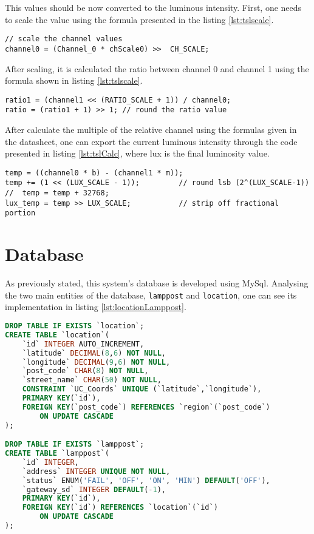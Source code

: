 This values should be now converted to the luminous intensity. First, one needs to scale the value using the formula presented in the listing \ref{lst:tslscale}.

\begin{lstlisting}[caption={TSL2581 Channel 0 scaling.}, label={lst:tslscale}]
// scale the channel values
channel0 = (Channel_0 * chScale0) >>  CH_SCALE;
\end{lstlisting}

After scaling, it is calculated the ratio between channel 0 and channel 1 using the formula shown in listing \ref{lst:tslscale}.

\begin{lstlisting}[caption={TSL2581 ratio calculation.}, label={lst:tslratio}]
ratio1 = (channel1 << (RATIO_SCALE + 1)) / channel0;
ratio = (ratio1 + 1) >> 1; // round the ratio value
\end{lstlisting}

After calculate the multiple of the relative channel using the formulas given in the datasheet, one can export the current luminous intensity through the code presented in listing \ref{lst:tslCalc}, where lux is the final luminosity value. 

\begin{lstlisting}[caption={TSL2581 luminosity value calculation.}, label={lst:tslCalc}]
temp = ((channel0 * b) - (channel1 * m));
temp += (1 << (LUX_SCALE - 1));			// round lsb (2^(LUX_SCALE-1))
//  temp = temp + 32768;
lux_temp = temp >> LUX_SCALE;			// strip off fractional portion
\end{lstlisting}

\clearpage
\section{Database}
As previously stated, this system's database is developed using MySql. Analysing the two main entities of the database, \verb|lamppost| and \verb|location|, one can see its implementation in listing \ref{lst:locationLamppost}.

\begin{lstlisting}[language=SQL, caption={Queries to create tables location and lamppost.}, label={lst:locationLamppost}]
DROP TABLE IF EXISTS `location`;
CREATE TABLE `location`(
	`id` INTEGER AUTO_INCREMENT,
	`latitude` DECIMAL(8,6) NOT NULL,
	`longitude` DECIMAL(9,6) NOT NULL,
	`post_code` CHAR(8) NOT NULL,
	`street_name` CHAR(50) NOT NULL,
	CONSTRAINT `UC_Coords` UNIQUE (`latitude`,`longitude`),
	PRIMARY KEY(`id`),
	FOREIGN KEY(`post_code`) REFERENCES `region`(`post_code`)
		ON UPDATE CASCADE
);

DROP TABLE IF EXISTS `lamppost`;
CREATE TABLE `lamppost`(
	`id` INTEGER,
	`address` INTEGER UNIQUE NOT NULL,
	`status` ENUM('FAIL', 'OFF', 'ON', 'MIN') DEFAULT('OFF'),
	`gateway_sd` INTEGER DEFAULT(-1),
	PRIMARY KEY(`id`),
	FOREIGN KEY(`id`) REFERENCES `location`(`id`)
		ON UPDATE CASCADE
);
\end{lstlisting}

